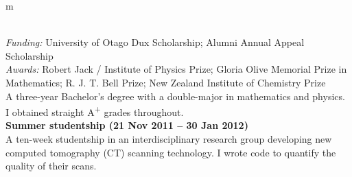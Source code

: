 \documentclass[10pt,a4paper,final]{article}
\begin{document}
\begin{tabularx}{\textwidth}{
   m{\dimexpr{}\tabcolsep}}
{{\begin{minipage}[b]{0.93\linewidth}
   \end{minipage}
      }
   } \\
   \textit{Funding:} University of Otago Dux Scholarship; Alumni Annual Appeal Scholarship\\
   \textit{Awards:} Robert Jack / Institute of Physics Prize; Gloria Olive Memorial Prize in Mathematics; R. J. T. Bell Prize; New Zealand Institute of Chemistry Prize \\
   A three-year Bachelor's degree with a double-major in mathematics and physics. I obtained straight A\textsuperscript{+} grades throughout.
   \\
   \textbf{Summer studentship (21 Nov 2011 -- 30 Jan 2012)}                                                                                                                                                                                                                                                                                                     \\
   A ten-week studentship in an interdisciplinary research group developing new computed tomography (CT) scanning technology. I wrote code to quantify the quality of their scans.\\
\end{tabularx}
\end{document}

